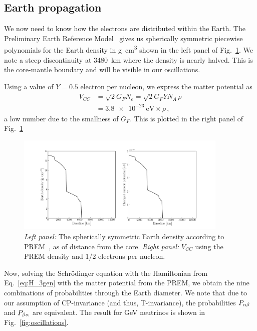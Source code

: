 \subsection{Earth propagation}
We now need to know how the electrons are distributed within the Earth. The Preliminary Earth Reference Model~\cite{PREM} gives us spherically
symmetric piecewise polynomials for the Earth density in \si{\gram\cm^3} shown in the left panel of Fig.~\ref{fig:potential}.
We note a steep discontinuity at \SI{3480}{\km} where the density is nearly halved. This is the core-mantle boundary and will be visible in our 
oscillations.

Using a value of $Y=0.5$ electron per nucleon, we express the matter potential as
\begin{align}
    V_{CC} &= \sqrt{2}G_F N_e = \sqrt{2}G_F Y N_A \,\rho \nonumber \\
           &= \SI{3.8e-23}{\eV} \times \rho\,,
\end{align}
a low number due to the smallness of $G_F$. This is plotted in the right panel of Fig.~\ref{fig:potential}
\begin{figure}
    \centering
    \includegraphics[width=0.9\textwidth]{figures/potential.pdf}
    \caption{\emph{Left panel:} The spherically symmetric Earth density according to PREM~\cite{PREM}, as of distance from the core.
    \emph{Right panel:} $V_{CC}$ using the PREM density and 1/2 electrons per nucleon.}\label{fig:potential}
\end{figure}

Now, solving the Schrödinger equation with the Hamiltonian from Eq.~\ref{eq:H_3gen} with the matter potential from the PREM,
we obtain the nine combinations of probabilities through the Earth diameter. We note that due to our assumption of CP-invariance
(and thus, T-invariance), the probabilities $P_{\alpha\beta}$ and $P_{\beta\alpha}$ are equivalent. The result for \si{\GeV} neutrinos 
is shown in Fig.~\ref{fig:oscillations}.

